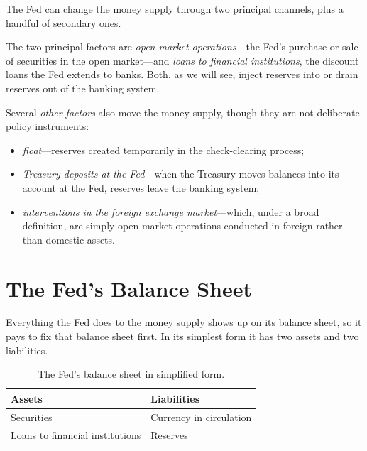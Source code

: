 The Fed can change the money supply through two principal channels, plus a handful of secondary ones.

The two principal factors are \emph{open market operations}---the Fed's purchase or sale of securities in the open market---and \emph{loans to financial institutions}, the discount loans the Fed extends to banks. Both, as we will see, inject reserves into or drain reserves out of the banking system.

Several \emph{other factors} also move the money supply, though they are not deliberate policy instruments:
\begin{itemize}
    \item \emph{float}---reserves created temporarily in the check-clearing process;
    \item \emph{Treasury deposits at the Fed}---when the Treasury moves balances into its account at the Fed, reserves leave the banking system;
    \item \emph{interventions in the foreign exchange market}---which, under a broad definition, are simply open market operations conducted in foreign rather than domestic assets.
\end{itemize}

\section{The Fed's Balance Sheet}

Everything the Fed does to the money supply shows up on its balance sheet, so it pays to fix that balance sheet first. In its simplest form it has two assets and two liabilities.

\begin{table}[h]
\centering
\caption{The Fed's balance sheet in simplified form.}
\label{tab:money-fed-balance-sheet}
\begin{tabular}{@{}ll@{}}
\toprule
\textbf{Assets} & \textbf{Liabilities} \\
\midrule
Securities & Currency in circulation \\
Loans to financial institutions & Reserves \\
\bottomrule
\end{tabular}
\end{table}


